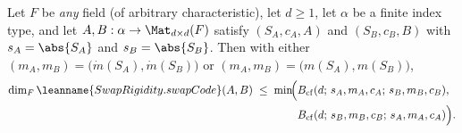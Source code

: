\begin{theorem}\label{thm:two-sided-coarse-fine}
Let $F$ be \emph{any} field (of arbitrary characteristic), let $d \ge 1$, let $\alpha$ be a finite
index type, and let $A, B : \alpha \to \Mat_{d\times d}(F)$ satisfy
 $(S_A, c_A, A)$ and
 $(S_B, c_B, B)$ with $s_A = \abs{S_A}$ and
$s_B = \abs{S_B}$. Then with either $(m_A, m_B) = \bigl(\dot{m}(S_A), \dot{m}(S_B)\bigr)$ or
$(m_A, m_B) = \bigl(m(S_A), m(S_B)\bigr)$,
\begin{align*}
  \dim_F \leanname{SwapRigidity.swapCode}(A, B)
  &\;\le\;
  \min\!\Bigl(
    B_{\mathrm{cf}}(d;\, s_A, m_A, c_A;\, s_B, m_B, c_B), \\
  &\qquad\qquad
    B_{\mathrm{cf}}(d;\, s_B, m_B, c_B;\, s_A, m_A, c_A)
  \Bigr).
\end{align*}
\end{theorem}

